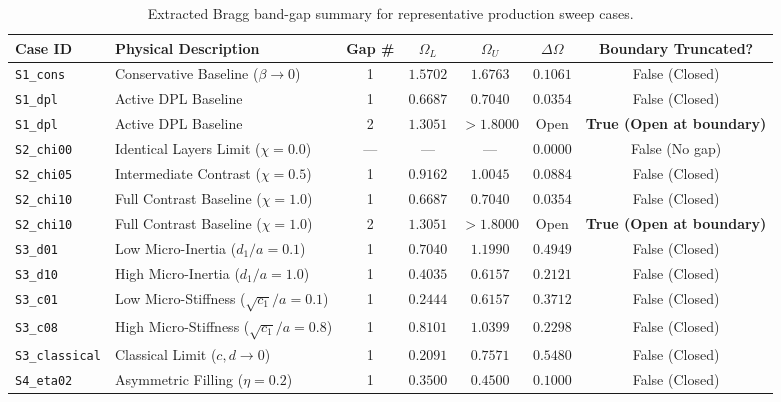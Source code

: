 \documentclass[11pt,a4paper]{article}
\begin{document}
\begin{table}[htbp]
\centering
\caption{Extracted Bragg band-gap summary for representative production sweep cases.}
\label{tab:bandgap_summary}
\small
\begin{tabular*}{\textwidth}{@{\extracolsep{\fill}}llccccc@{}}
\toprule
Case ID & Physical Description & Gap \# & $\Omega_L$ & $\Omega_U$ & $\Delta\Omega$ & Boundary Truncated? \\
\midrule
\texttt{S1\_cons} & Conservative Baseline ($\beta \to 0$) & 1 & $1.5702$ & $1.6763$ & $0.1061$ & False (Closed) \\
\texttt{S1\_dpl} & Active DPL Baseline & 1 & $0.6687$ & $0.7040$ & $0.0354$ & False (Closed) \\
\texttt{S1\_dpl} & Active DPL Baseline & 2 & $1.3051$ & $>1.8000$ & Open & \textbf{True (Open at boundary)} \\
\texttt{S2\_chi00} & Identical Layers Limit ($\chi=0.0$) & --- & --- & --- & $\mathbf{0.0000}$ & False (No gap) \\
\texttt{S2\_chi05} & Intermediate Contrast ($\chi=0.5$) & 1 & $0.9162$ & $1.0045$ & $0.0884$ & False (Closed) \\
\texttt{S2\_chi10} & Full Contrast Baseline ($\chi=1.0$) & 1 & $0.6687$ & $0.7040$ & $0.0354$ & False (Closed) \\
\texttt{S2\_chi10} & Full Contrast Baseline ($\chi=1.0$) & 2 & $1.3051$ & $>1.8000$ & Open & \textbf{True (Open at boundary)} \\
\texttt{S3\_d01} & Low Micro-Inertia ($d_1/a=0.1$) & 1 & $0.7040$ & $1.1990$ & $0.4949$ & False (Closed) \\
\texttt{S3\_d10} & High Micro-Inertia ($d_1/a=1.0$) & 1 & $0.4035$ & $0.6157$ & $0.2121$ & False (Closed) \\
\texttt{S3\_c01} & Low Micro-Stiffness ($\sqrt{c_1}/a=0.1$) & 1 & $0.2444$ & $0.6157$ & $0.3712$ & False (Closed) \\
\texttt{S3\_c08} & High Micro-Stiffness ($\sqrt{c_1}/a=0.8$) & 1 & $0.8101$ & $1.0399$ & $0.2298$ & False (Closed) \\
\texttt{S3\_classical} & Classical Limit ($c, d \to 0$) & 1 & $0.2091$ & $0.7571$ & $0.5480$ & False (Closed) \\
\texttt{S4\_eta02} & Asymmetric Filling ($\eta=0.2$) & 1 & $0.3500$ & $0.4500$ & $0.1000$ & False (Closed) \\
\bottomrule
\end{tabular*}
\end{table}
\end{document}
